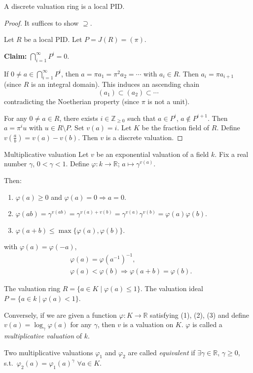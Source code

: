 \documentclass[11pt, a4paper]{report}
\begin{document}
\begin{theorem}
A discrete valuation ring is a local PID.
\end{theorem}

\begin{proof}
It suffices to show $\supseteq$.

Let $R$ be a local PID. Let $P=J(R)=(\pi)$.

\textbf{Claim:} $\bigcap_{i=1}^{\infty} P^{i}=0$.

If $0 \neq a \in \bigcap_{i=1}^{\infty} P^{i}$, then $a=\pi a_{1}=\pi^{2} a_{2}=\cdots$ with $a_{i} \in R$. Then $a_{i}=\pi a_{i+1}$ (since $R$ is an integral domain). This induces an ascending chain
\[\left(a_{1}\right) \subset \left(a_{2}\right) \subset \cdots\]
contradicting the Noetherian property (since $\pi$ is not a unit).

For any $0 \neq a \in R$, there exists $i \in \mathbb{Z}_{\geqslant 0}$ such that $a \in P^{i}$, $a \notin P^{i+1}$. Then $a=\pi^{i} u$ with $u \in R \setminus P$. Set $v(a)=i$. Let $K$ be the fraction field of $R$. Define $v\left(\frac{a}{b}\right)=v(a)-v(b)$. Then $v$ is a discrete valuation.
\end{proof}

\begin{definition}
Multiplicative valuation
Let $v$ be an exponential valuation of a field $k$. Fix a real number $\gamma$, $0<\gamma<1$. Define $\varphi: k \rightarrow \mathbb{R}$; $a \mapsto \gamma^{v(a)}$.

Then:
\begin{enumerate}
\item $\varphi(a) \geqslant 0$ and $\varphi(a)=0 \Rightarrow a=0$.
\item $\varphi(ab)=\gamma^{v(ab)}=\gamma^{v(a)+v(b)}=\gamma^{v(a)}\gamma^{v(b)}=\varphi(a)\varphi(b)$.
\item $\varphi(a+b) \leqslant \max \{\varphi(a), \varphi(b)\}$.
\end{enumerate}
with $\varphi(a)=\varphi(-a)$,
\[
\begin{aligned}
& \varphi(a)=\varphi\left(a^{-1}\right)^{-1}, \\
& \varphi(a)<\varphi(b) \Rightarrow \varphi(a+b)=\varphi(b).
\end{aligned}
\]

The valuation ring $R=\{a \in K \mid \varphi(a) \leq 1\}$. The valuation ideal $P=\{a \in k \mid \varphi(a)<1\}$.

Conversely, if we are given a function $\varphi: K \rightarrow \mathbb{R}$ satisfying (1), (2), (3) and define $v(a)=\log_{\gamma} \varphi(a)$ for any $\gamma$, then $v$ is a valuation on $K$. $\varphi$ is called a \emph{multiplicative valuation} of $k$.

Two multiplicative valuations $\varphi_{1}$ and $\varphi_{2}$ are called \emph{equivalent} if $\exists \gamma \in \mathbb{R}$, $\gamma \geqslant 0$, s.t.\ $\varphi_{2}(a)=\varphi_{1}(a)^{\gamma}$ $\forall a \in K$.

\end{definition}
\end{document}
